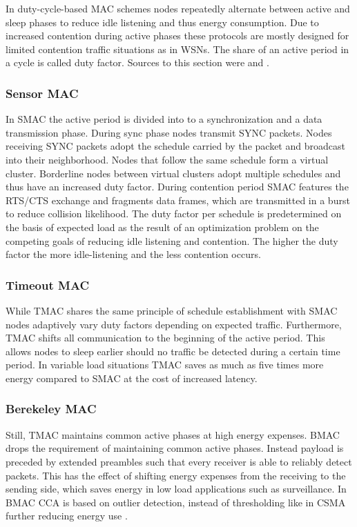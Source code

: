In duty-cycle-based MAC schemes nodes repeatedly alternate between active and sleep phases to reduce idle listening and thus energy consumption. Due to increased contention during active phases these protocols are mostly designed for limited contention traffic situations as in WSNs. The share of an active period in a cycle is called duty factor. Sources to this section were \cite{Bachir10} and \cite{Demirkol06}.

\subsubsection{Sensor MAC}

In SMAC the active period is divided into to a synchronization and a data transmission phase. During sync phase nodes transmit SYNC packets. Nodes receiving SYNC packets adopt the schedule carried by the packet and broadcast into their neighborhood. Nodes that follow the same schedule form a virtual cluster. Borderline nodes between virtual clusters adopt multiple schedules and thus have an increased duty factor. During contention period SMAC features the RTS/CTS exchange and fragments data frames, which are transmitted in a burst to reduce collision likelihood. The duty factor per schedule is predetermined on the basis of expected load as the result of an optimization problem on the competing goals of reducing idle listening and contention. The higher the duty factor the more idle-listening and the less contention occurs.

\subsubsection{Timeout MAC}

While TMAC shares the same principle of schedule establishment with SMAC nodes adaptively vary duty factors depending on expected traffic. Furthermore, TMAC shifts all communication to the beginning of the active period. This allows nodes to sleep earlier should no traffic be detected during a certain time period. In variable load situations TMAC saves as much as five times more energy compared to SMAC at the cost of increased latency. 

\subsubsection{Berekeley MAC}

Still, TMAC maintains common active phases at high energy expenses. BMAC drops the requirement of maintaining common active phases. Instead payload is preceded by extended preambles such that every receiver is able to reliably detect packets. This has the effect of shifting energy expenses from the receiving to the sending side, which saves energy in low load applications such as surveillance. In BMAC CCA is based on outlier detection, instead of thresholding like in CSMA further reducing energy use \cite{Polastre04}. 


